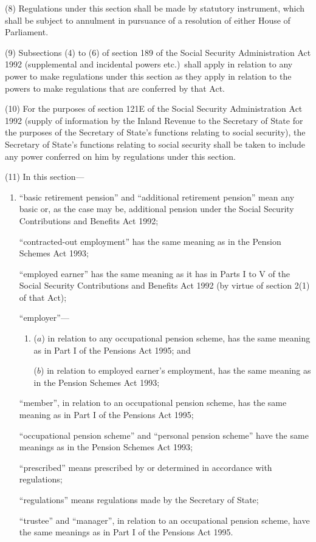 \documentclass[12pt,a4paper]{article}
\begin{document}
(8) Regulations under this section shall be made by statutory instrument, which shall be subject to annulment in pursuance of a resolution of either House of Parliament.

(9) Subsections (4)  to (6)  of section 189 of the Social Security Administration Act 1992 (supplemental and incidental powers etc.)\ shall apply in relation to any power to make regulations under this section as they apply in relation to the powers to make regulations that are conferred by that Act.

(10) For the purposes of section 121E of the Social Security Administration Act 1992 (supply of information by the Inland Revenue to the Secretary of State for the purposes of the Secretary of State’s functions relating to social security), the Secretary of State’s functions relating to social security shall be taken to include any power conferred on him by regulations under this section.

(11) In this section—
\begin{enumerate}\item[]
    “basic retirement pension” and “additional retirement pension” mean any basic or, as the case may be, additional pension under the Social Security Contributions and Benefits Act 1992;

    “contracted-out employment” has the same meaning as in the Pension Schemes Act 1993;

    “employed earner” has the same meaning as it has in Parts I to V of the Social Security Contributions and Benefits Act 1992 (by virtue of section 2(1)  of that Act);

    “employer”—
\begin{enumerate}\item[]
    ($a$) 
    in relation to any occupational pension scheme, has the same meaning as in Part I of the Pensions Act 1995; and

    ($b$) 
    in relation to employed earner’s employment, has the same meaning as in the Pension Schemes Act 1993;
\end{enumerate}

    “member”, in relation to an occupational pension scheme, has the same meaning as in Part I of the Pensions Act 1995;

    “occupational pension scheme” and “personal pension scheme” have the same meanings as in the Pension Schemes Act 1993;

    “prescribed” means prescribed by or determined in accordance with regulations;

    “regulations” means regulations made by the Secretary of State;

    “trustee” and “manager”, in relation to an occupational pension scheme, have the same meanings as in Part I of the Pensions Act 1995.  
\end{enumerate}
\end{document}
